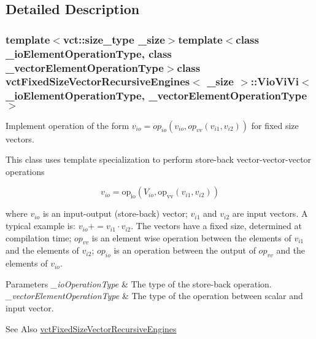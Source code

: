 \subsection{Detailed Description}
\subsubsection*{template$<$vct\-::size\-\_\-type \-\_\-size$>$template$<$class \-\_\-io\-Element\-Operation\-Type, class \-\_\-vector\-Element\-Operation\-Type$>$class vct\-Fixed\-Size\-Vector\-Recursive\-Engines$<$ \-\_\-size $>$\-::\-Vio\-Vi\-Vi$<$ \-\_\-io\-Element\-Operation\-Type, \-\_\-vector\-Element\-Operation\-Type $>$}

Implement operation of the form $v_{io} = op_{io}(v_{io}, op_{vv}(v_{i1}, v_{i2}))$ for fixed size vectors. 

This class uses template specialization to perform store-\/back vector-\/vector-\/vector operations

\[ v_{io} = \mathrm{op_{io}}(V_{io}, \mathrm{op_{vv}}(v_{i1}, v_{i2})) \]

where $v_{io}$ is an input-\/output (store-\/back) vector; $v_{i1}$ and $v_{i2}$ are input vectors. A typical example is\-: $v_{io} += v_{i1} \cdot v_{i2}$. The vectors have a fixed size, determined at compilation time; $op_{vv}$ is an element wise operation between the elements of $v_{i1}$ and the elements of $v_{i2}$; $op_{io}$ is an operation between the output of $op_{vv}$ and the elements of $v_{io}$.


\begin{DoxyParams}{Parameters}
{\em \-\_\-io\-Operation\-Type} & The type of the store-\/back operation.\\
\hline
{\em \-\_\-vector\-Element\-Operation\-Type} & The type of the operation between scalar and input vector.\\
\hline
\end{DoxyParams}
\begin{DoxySeeAlso}{See Also}
\hyperlink{classvct_fixed_size_vector_recursive_engines}{vct\-Fixed\-Size\-Vector\-Recursive\-Engines} 
\end{DoxySeeAlso}


